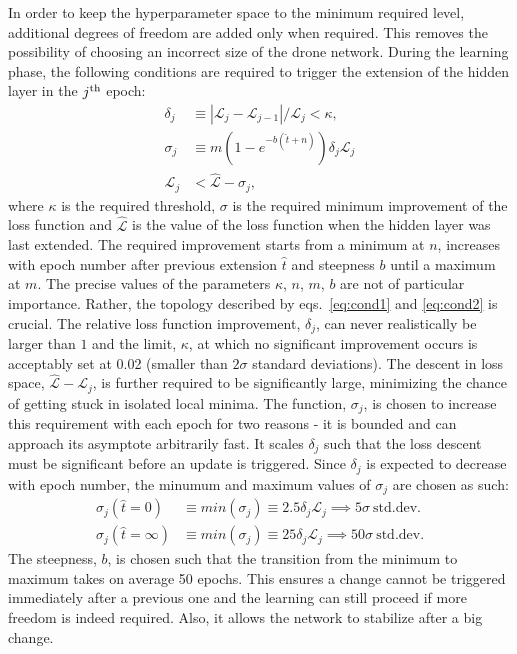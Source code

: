 \documentclass[final,5p,times,twocolumn]{elsarticle}
\begin{document}
In order to keep the hyperparameter space to the minimum required level,
additional degrees of freedom are added only when required.
This removes the possibility of choosing an incorrect size of the
drone network. During the learning phase, the following conditions are required
to trigger the extension of the hidden layer in the $j^{\rm th}$ epoch:
\begin{align}
\delta_{j} &\equiv |\mathcal{L}_j-\mathcal{L}_{j-1}|/\mathcal{L}_j < \kappa,\label{eq:cond1}\\
\sigma_{j} &\equiv m (1 - e^{-b(\hat{t} + n)})\delta_{j}\mathcal{L}_j \nonumber\\
\mathcal{L}_j &< \hat{\mathcal{L}} - \sigma_{j} \label{eq:cond2},
\end{align}
where $\kappa$ is the required threshold, $\sigma$ is the required minimum improvement
of the loss function and $\hat{\mathcal{L}}$ is the value of the loss function when
the hidden layer was last extended. The required improvement starts from a minimum at $n$,
increases with epoch number after previous extension $\hat{t}$ and steepness $b$
until a maximum at $m$. The precise values of the parameters
$\kappa$, $n$, $m$, $b$ are not of particular importance. Rather, the topology described by
eqs.~\ref{eq:cond1} and \ref{eq:cond2} is crucial. The relative loss function improvement,
$\delta_{j}$, can never realistically be larger than $1$ and the limit, $\kappa$, at which
no significant improvement occurs is acceptably set at 0.02 (smaller than $2\sigma$
standard deviations). The descent in loss space, $\hat{\mathcal{L}} - \mathcal{L}_j$,
is further required to be significantly large, minimizing the chance of getting stuck in
isolated local minima. The function, $\sigma_{j}$, is chosen to increase this requirement
with each epoch for two reasons - it is bounded and can approach its asymptote arbitrarily fast.
It scales $\delta_{j}$ such that the loss descent must be significant
before an update is triggered. Since $\delta_{j}$ is expected to decrease with epoch number,
the minumum and maximum values of $\sigma_{j}$ are chosen as such:
\begin{align}
\sigma_{j}(\hat{t} = 0) &\equiv min(\sigma_{j}) \equiv 2.5\delta_{j}\mathcal{L}_j \implies 5\sigma ~\text{std.dev.} \\
\sigma_{j}(\hat{t} = \infty) &\equiv min(\sigma_{j}) \equiv 25\delta_{j}\mathcal{L}_j \implies 50\sigma ~\text{std.dev.}
\end{align}
The steepness, $b$, is chosen such that the transition from the minimum to maximum takes
on average 50 epochs. This ensures a change cannot be triggered immediately
after a previous one and the learning can still proceed if more freedom is indeed required.
Also, it allows the network to stabilize after a big change.
\end{document}
